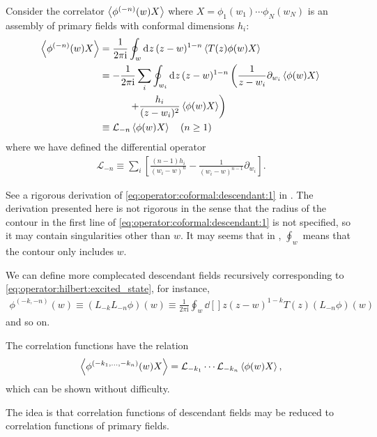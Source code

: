 \documentclass[10pt]{article}
\newcommand{\ii}{\mathrm{i}}
\begin{document}
Consider the correlator $\expval{\phi^{(-n)}(w)X}$ where $X=\phi_1(w_1)\cdots\phi_N(w_N)$ is an assembly of primary fields with conformal dimensions $h_i$:
\begin{align}
    \expval{\phi^{(-n)}(w)X}&=\frac{1}{2\pi\ii}\oint_w\dd[]{z}(z-w)^{1-n}\expval{T(z)\phi(w)X}\notag\\
                            &=-\frac{1}{2\pi\ii}\sum_i\oint_{w_i}\dd[]{z}(z-w)^{1-n}\left(\frac{1}{z-w_i}\partial_{w_i}\expval{\phi(w)X}\right.\notag\\
                            &\quad\quad\quad\left.+\frac{h_i}{(z-w_i)^2}\expval{\phi(w)X}\right)\notag\\
                            &\equiv\mathcal{L}_{-n}\expval{\phi(w)X}\quad(n\geq1)\label{eq:operator:coformal:descendant:1}
\end{align}
where we have defined the differential operator 
\begin{align}
    \mathcal{L}_{-n}\equiv\sum_{i}\left[\frac{(n-1)h_i}{(w_i-w)^n}-\frac{1}{(w_i-w)^{n-1}}\partial_{w_i}\right].
\end{align}
\begin{notice}
    See a rigorous derivation of \cref{eq:operator:coformal:descendant:1} in \cite{Ribault:2014hia}.
    The derivation presented here is not rigorous in the sense that the radius of the contour in the first line of \cref{eq:operator:coformal:descendant:1} is not specified, so it may contain singularities other than $w$.
    It may seems that in \cite{DiFrancesco:1997nk}, $\oint_w$ means that the contour only includes $w$.
\end{notice}

We can define more complecated descendant fields recursively corresponding to \cref{eq:operator:hilbert:excited_state}, for instance,
\begin{align}
    \phi^{(-k,-n)}(w)\equiv(L_{-k}L_{-n}\phi)(w)\equiv\frac{1}{2\pi\ii}\oint_w\dd[]{z}(z-w)^{1-k}T(z)(L_{-n}\phi)(w)
\end{align}
and so on.
\begin{claim}
    The correlation functions have the relation 
    \begin{align}
        \expval{\phi^{(-k_1,\dots,-k_n)}(w)X}=\mathcal{L}_{-k_1}\cdots\mathcal{L}_{-k_n}\expval{\phi(w)X},
    \end{align}
    which can be shown without difficulty.
\end{claim}
\begin{remark}
    The idea is that correlation functions of descendant fields may be reduced to correlation functions of primary fields.
\end{remark}
\end{document}
